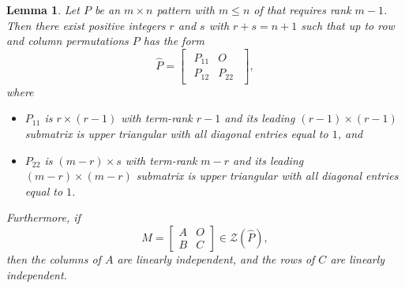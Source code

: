 \documentclass[preprint,12pt]{elsarticle}
\newtheorem{lemma}[theorem]{Lemma}
\begin{document}
\begin{lemma}
\label{n-2form}
    Let $P$ be an $m \times n$ pattern with $m \leq n$ of that requires rank $m-1$. Then 
    there exist positive integers $r$ and $s$ with $r+s=n+1$ such that up to row and column permutations  $P$ has the form 
    \[ 
    \widehat{P}=
    \begin{bmatrix}
    \begin{array}{c|c}
        P_{11} & O \\ \hline 
        P_{12} & P_{22} \end{array}
    \end{bmatrix},\]
    where 
    \begin{itemize}
        \item[\rm (a)]
    $P_{11}$ is $r \times (r-1)$ with term-rank $r-1$
    and its leading $(r-1)\times (r-1)$ submatrix
    is upper triangular with all diagonal entries equal to $1$,  and
    \item [\rm (b)]
    $P_{22}$ is $(m-r) \times s$ with term-rank $m-r$ and its leading $(m-r)\times (m-r)$ submatrix is 
    upper triangular with all diagonal entries equal to $1$.
    \end{itemize}
    Furthermore, if 
    \[
    M = \left\lbrack 
    \begin{array}{c|c}
         A & O  \\
         \hline
         B & C 
    \end{array}
    \right\rbrack \in \mathcal{Z}(\widehat{P}),
    \]
then  
    the columns of $A$ are linearly independent, and 
    the rows of $C$ are linearly independent.
\end{lemma}
\end{document}
